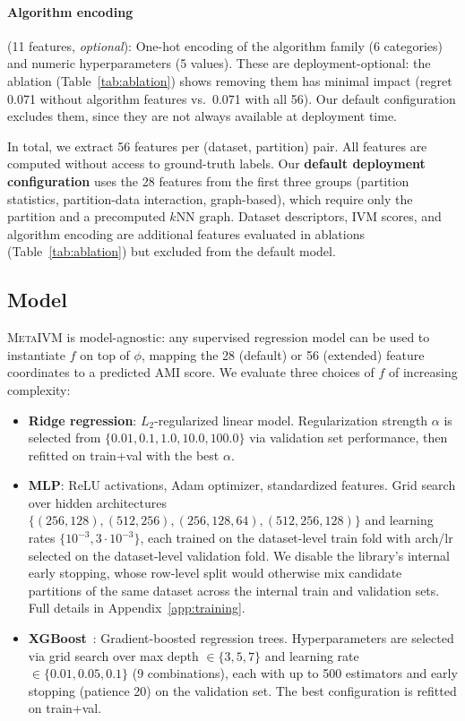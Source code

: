 \documentclass[10pt]{article} %
\newcommand{\ours}{\textsc{MetaIVM}}
\begin{document}
\paragraph{Algorithm encoding} (11 features, \emph{optional}): One-hot encoding of the algorithm family (6 categories) and numeric hyperparameters (5 values). These are deployment-optional: the ablation (Table~\ref{tab:ablation}) shows removing them has minimal impact (regret 0.071 without algorithm features vs.\ 0.071 with all 56). Our default configuration excludes them, since they are not always available at deployment time.

In total, we extract 56 features per (dataset, partition) pair. All features are computed without access to ground-truth labels. Our \textbf{default deployment configuration} uses the 28 features from the first three groups (partition statistics, partition-data interaction, graph-based), which require only the partition and a precomputed $k$NN graph. Dataset descriptors, IVM scores, and algorithm encoding are additional features evaluated in ablations (Table~\ref{tab:ablation}) but excluded from the default model.

\subsection{Model}

\ours{} is model-agnostic: any supervised regression model can be used to instantiate $f$ on top of $\phi$, mapping the 28 (default) or 56 (extended) feature coordinates to a predicted AMI score. We evaluate three choices of $f$ of increasing complexity:
\begin{itemize}
    \item \textbf{Ridge regression}: $L_2$-regularized linear model. Regularization strength $\alpha$ is selected from $\{0.01, 0.1, 1.0, 10.0, 100.0\}$ via validation set performance, then refitted on train+val with the best $\alpha$.
    \item \textbf{MLP}: ReLU activations, Adam optimizer, standardized features. Grid search over hidden architectures $\{(256,128), (512,256), (256,128,64), (512,256,128)\}$ and learning rates $\{10^{-3}, 3 \cdot 10^{-3}\}$, each trained on the dataset-level train fold with arch/lr selected on the dataset-level validation fold. We disable the library's internal early stopping, whose row-level split would otherwise mix candidate partitions of the same dataset across the internal train and validation sets. Full details in Appendix~\ref{app:training}.
    \item \textbf{XGBoost}~\citep{chen2016xgboost}: Gradient-boosted regression trees. Hyperparameters are selected via grid search over max depth $\in \{3, 5, 7\}$ and learning rate $\in \{0.01, 0.05, 0.1\}$ (9 combinations), each with up to 500 estimators and early stopping (patience 20) on the validation set. The best configuration is refitted on train+val.
\end{itemize}
\end{document}
